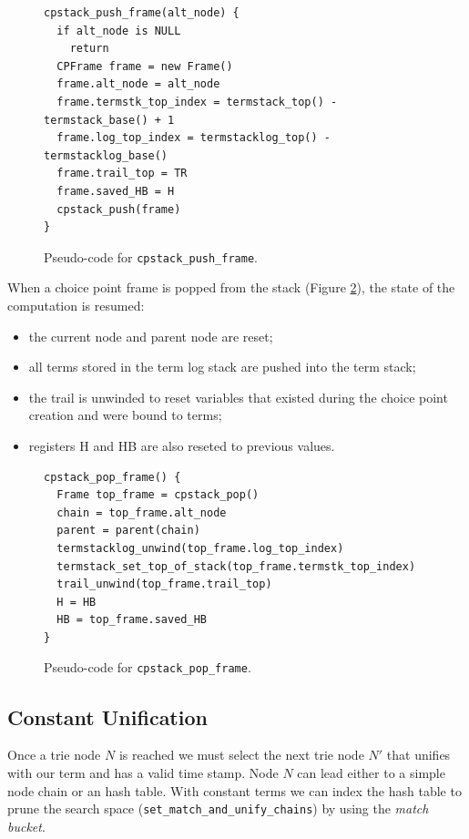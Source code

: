 \begin{figure}[h]
\begin{Verbatim}
cpstack_push_frame(alt_node) {
  if alt_node is NULL
    return
  CPFrame frame = new Frame()
  frame.alt_node = alt_node
  frame.termstk_top_index = termstack_top() - termstack_base() + 1
  frame.log_top_index = termstacklog_top() - termstacklog_base()
  frame.trail_top = TR
  frame.saved_HB = H
  cpstack_push(frame)
}
\end{Verbatim}
\caption{Pseudo-code for \texttt{cpstack\_push\_frame}.}
\label{fig:cpstack_push_frame}
\end{figure}

When a choice point frame is popped from the stack (Figure \ref{fig:cpstack_pop_frame}),
the state of the computation is resumed:

\begin{itemize}
  \item the current node and parent node are reset;
  \item all terms stored in the term log stack are pushed into the term stack;
  \item the trail is unwinded to reset variables that existed during the choice point creation and were bound to terms;
  \item registers H and HB are also reseted to previous values.
\end{itemize}

\begin{figure}[h]
\begin{Verbatim}
cpstack_pop_frame() {
  Frame top_frame = cpstack_pop()
  chain = top_frame.alt_node
  parent = parent(chain)
  termstacklog_unwind(top_frame.log_top_index)
  termstack_set_top_of_stack(top_frame.termstk_top_index)
  trail_unwind(top_frame.trail_top)
  H = HB
  HB = top_frame.saved_HB
}
\end{Verbatim}
\caption{Pseudo-code for \texttt{cpstack\_pop\_frame}.}
\label{fig:cpstack_pop_frame}
\end{figure}

\subsection{Constant Unification}

Once a trie node $N$ is reached we must select the next trie node $N'$ that unifies with our term and has a valid time stamp. Node $N$ can lead either to a simple node chain or an hash table.
With constant terms we can index the hash table to prune the search space (\texttt{set\_match\_and\_unify\_chains}) by using the \textit{match bucket}.

